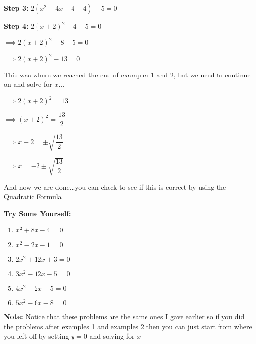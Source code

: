 \documentclass[12pt]{article}
\begin{document}
\textbf{Step 3:} $2(x^2 +4x +4 - 4) - 5=0$

\textbf{Step 4:} $2(x + 2)^2 - 4- 5=0$

\hspace{.45cm} $\implies 2(x + 2)^2 - 8 - 5=0$

\hspace{.45cm} $\implies 2(x + 2)^2 - 13=0$

This was where we reached the end of examples 1 and 2, but we need to continue on and solve for $x$...

\hspace{.45cm} $\implies 2(x + 2)^2 = 13$


\hspace{.45cm} $\implies (x + 2)^2 = \dfrac{13}{2} $

\hspace{.45cm} $\implies x + 2 = \pm \sqrt{\dfrac{13}{2}}$

\hspace{.45cm} $\implies x  = -2 \pm \sqrt{\dfrac{13}{2}}$

And now we are done...you can check to see if this is correct by using the Quadratic Formula


\textbf{Try Some Yourself:}

\begin{enumerate}
\item $x^2 +8x - 4=0$
\item $x^2 - 2x - 1=0$
\item $2x^2 + 12x +3=0$
\item $3x^2 - 12x - 5=0$
\item $4x^2 - 2x - 5=0$
\item $5x^2 - 6x - 8=0$
\end{enumerate}

\textbf{Note:} Notice that these problems are the same ones I gave earlier so if you did the problems after examples 1 and examples 2 then you can just start from where you left off by setting $y = 0$ and solving for $x$
\end{document}
